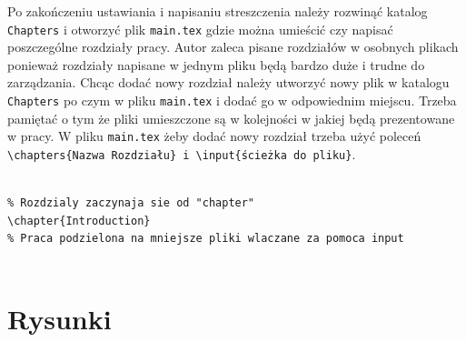Po zakończeniu ustawiania i napisaniu streszczenia należy rozwinąć katalog \texttt{Chapters} i otworzyć plik \texttt{main.tex} gdzie można umieścić czy napisać poszczególne rozdziały pracy. Autor zaleca pisane rozdziałów w osobnych plikach ponieważ rozdziały napisane w jednym pliku będą  bardzo duże i trudne do zarządzania. Chcąc dodać nowy rozdział należy utworzyć nowy plik w katalogu \texttt{Chapters} po czym w pliku \texttt{main.tex} i dodać go w odpowiednim miejscu. Trzeba pamiętać o tym że pliki umieszczone są w kolejności w jakiej będą prezentowane w pracy. W pliku \texttt{main.tex} żeby dodać nowy rozdział trzeba użyć poleceń \texttt{\textbackslash chapters\{Nazwa Rozdziału\} i \textbackslash input\{ścieżka do pliku\}}. 

\begin{lstlisting}[caption={Tworzenie nowych rozdziałów}, label=lst:Tworzenie nowych rozdziałów]

% Rozdzialy zaczynaja sie od "chapter"
\chapter{Introduction}
% Praca podzielona na mniejsze pliki wlaczane za pomoca input


\end{lstlisting}
\section{Rysunki}\label{sec:grafika}

